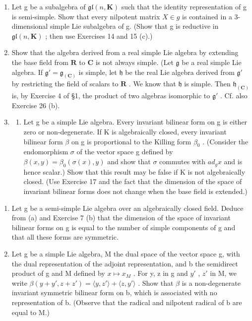 \begin{enumerate}
\def\labelenumi{\arabic{enumi}.}
\setcounter{enumi}{15}
\item
  Let g be a subalgebra of \(\mathfrak{gl}(n,\mathbf{K})\) such that the identity representation of g is semi-simple. Show that every nilpotent matrix \(X\in g\) is contained in a 3-dimensional simple Lie subalgebra of g. (Show that g is reductive in \(\mathfrak{gl}(n,\mathbf{K})\) ; then use Exercises 14 and 15 (c).)
\item
  Show that the algebra derived from a real simple Lie algebra by extending the base field from \(\mathbf{R}\) to \(\mathbf{C}\) is not always simple. (Let \(\mathfrak{g}\) be a real simple Lie algebra. If \(\mathfrak{g}' = \mathfrak{g}_{(\mathbf{C})}\) is simple, let \(\mathfrak{h}\) be the real Lie algebra derived from \(\mathfrak{g}'\) by restricting the field of scalars to \(\mathbf{R}\) . We know that \(\mathfrak{h}\) is simple. Then \(\mathfrak{h}_{(\mathbf{C})}\) is, by Exercise 4 of §1, the product of two algebras isomorphic to \(\mathfrak{g}'\) . Cf. also Exercise 26 (b).
\item
  \begin{enumerate}
  \def\labelenumii{(\alph{enumii})}
  \tightlist
  \item
    Let g be a simple Lie algebra. Every invariant bilinear form on g is either zero or non-degenerate. If K is algebraically closed, every invariant bilinear form \(\beta\) on g is proportional to the Killing form \(\beta_{0}\) . (Consider the endomorphism \(\sigma\) of the vector space g defined by \(\beta(x,y)=\beta_{0}(\sigma(x),y)\) and show that \(\sigma\) commutes with \(ad_{g}x\) and is hence scalar.) Show that this result may be false if K is not algebraically closed. (Use Exercise 17 and the fact that the dimension of the space of invariant bilinear forms does not change when the base field is extended.)
  \end{enumerate}
\end{enumerate}

\begin{enumerate}
\def\labelenumi{(\alph{enumi})}
\setcounter{enumi}{1}
\item
  Let g be a semi-simple Lie algebra over an algebraically closed field. Deduce from (a) and Exercise 7 (b) that the dimension of the space of invariant bilinear forms on g is equal to the number of simple components of g and that all these forms are symmetric.
\item
  Let g be a simple Lie algebra, M the dual space of the vector space g, with the dual representation of the adjoint representation, and b the semidirect product of g and M defined by \(x \mapsto x_{M}\) . For y, z in g and \(y'\) , \(z'\) in M, we write \(\beta(y + y', z + z') = \langle y, z' \rangle + \langle z, y' \rangle\) . Show that \(\beta\) is a non-degenerate invariant symmetric bilinear form on b, which is associated with no representation of b. (Observe that the radical and nilpotent radical of b are equal to M.)
\end{enumerate}


